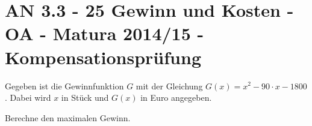 \section{AN 3.3 - 25 Gewinn und Kosten - OA - Matura 2014/15 - Kompensationsprüfung}

\begin{beispiel}[AN 3.3]{1} %
				Gegeben ist die Gewinnfunktion $G$ mit der Gleichung $G(x)=x^2-90\cdot x-1800$. Dabei wird $x$ in Stück und $G(x)$ in Euro angegeben.
				
				Berechne den maximalen Gewinn.\\
				
\end{beispiel}